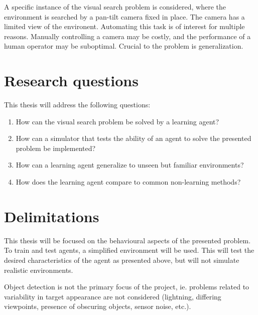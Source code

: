 A specific instance of the visual search problem is considered, where the environment is searched by a pan-tilt camera fixed in place. The camera has a limited view of the environent. Automating this task is of interest for multiple reasons. Manually controlling a camera may be costly, and the performance of a human operator may be suboptimal. Crucial to the problem is generalization.

\section{Research questions}
\label{sec:research-questions}

This thesis will address the following questions:

\begin{enumerate}
  \item How can the visual search problem be solved by a learning agent?
  \item How can a simulator that tests the ability of an agent to solve the presented problem be implemented?
  \item How can a learning agent generalize to unseen but familiar environments?
  \item How does the learning agent compare to common non-learning methods?
\end{enumerate}


\section{Delimitations}
\label{sec:delimitations}

This thesis will be focused on the behavioural aspects of the presented problem. To train and test agents, a simplified environment will be used. This will test the desired characteristics of the agent as presented above, but will not simulate realistic environments.

Object detection is not the primary focus of the project, ie. problems related to variability in target appearance are not considered (lightning, differing viewpoints, presence of obscuring objects, sensor noise, etc.).


